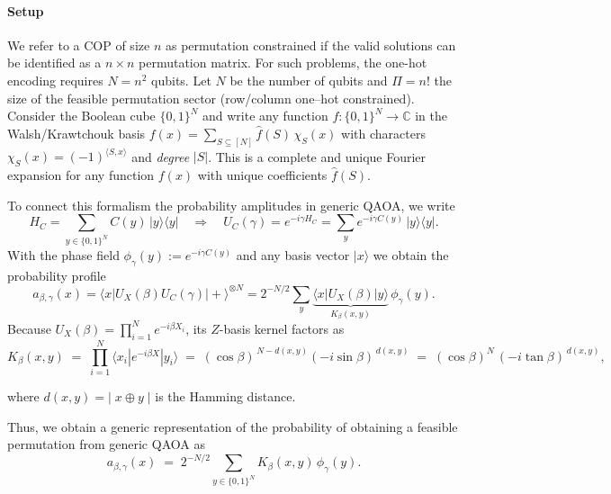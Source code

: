 \documentclass[a4paper,onecolumn,11pt,unpublished]{quantumarticle}
\theoremstyle{remark}
\begin{document}
\paragraph{Setup}
We refer to a COP of size $n$ as permutation constrained if the valid solutions can be identified as a $n \times n$ permutation matrix. For such problems, the one-hot encoding requires $N=n^2$ qubits. Let $N$ be the number of qubits and $\Pi=n!$ the size of the feasible permutation sector (row/column one–hot constrained). Consider the Boolean cube $\{0,1\}^N$ and write any function $f:\{0,1\}^N\!\to\!\mathbb{C}$ in the Walsh/Krawtchouk basis
$f(x)=\sum_{S\subseteq[N]}\widehat f(S)\,\chi_S(x)$ with characters $\chi_S(x)=(-1)^{\langle S,x\rangle}$ and \emph{degree} $|S|$. This is a complete and unique Fourier expansion for any function $f(x)$ with unique coefficients $\widehat f(S)$\cite{ODonnell2014}.

\medskip
\noindent
To connect this formalism the probability amplitudes in generic QAOA, we write
\[
  H_C=\sum_{y\in\{0,1\}^N} C(y)\,|y\rangle\!\langle y|
  \quad\Rightarrow\quad
  U_C(\gamma)=e^{-i\gamma H_C}
  =\sum_{y} e^{-i\gamma C(y)}\,|y\rangle\!\langle y|.
\]
With the phase field $\phi_\gamma(y):=e^{-i\gamma C(y)}$  and any basis vector $|x\rangle$ we obtain the probability profile
\[
  a_{\beta,\gamma}(x)
  =\langle x|U_X(\beta)U_C(\gamma)|+\rangle^{\otimes N}
  =2^{-N/2}\sum_{y} \underbrace{\langle x|U_X(\beta)|y\rangle}_{K_\beta(x,y)}\,\phi_\gamma(y).
\]
Because $U_X(\beta)=\prod_{i=1}^N e^{-i\beta X_i}$, its $Z$-basis kernel factors as
\begin{equation}
  K_\beta(x,y)
  \;=\; \prod_{i=1}^N \langle x_i|e^{-i\beta X}|y_i\rangle
  \;=\; (\cos\beta)^{\,N-d(x,y)}(-i\sin\beta)^{\,d(x,y)}
  \;=\; (\cos\beta)^{N}\,(-i\tan\beta)^{\,d(x,y)},
\end{equation}

where $d(x,y)=|\;x\oplus y\;|$ is the Hamming distance.  

\medskip
\noindent
Thus, we obtain a generic representation of the probability of obtaining a feasible permutation from generic QAOA as
\begin{equation}
\label{eq:generic-probability}
  a_{\beta,\gamma}(x)
  \;=\; 2^{-N/2}\sum_{y\in\{0,1\}^N} K_\beta(x,y)\,\phi_\gamma(y).
\end{equation}
\end{document}
